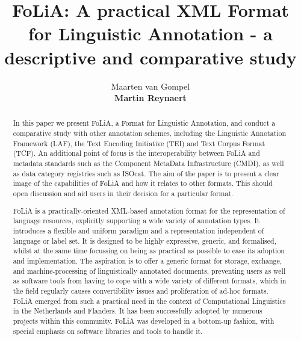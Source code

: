 \documentclass[a4paper,10pt,twoside]{article}
\begin{document}
\title{FoLiA: A practical XML Format for Linguistic Annotation - a descriptive and comparative study}

\author{Maarten van Gompel \\
{\normalsize \bf Martin Reynaert} 
\AND {} \AND {} }



\maketitle

\begin{abstract}

In this paper we present FoLiA, a Format for Linguistic Annotation, and conduct
a comparative study with other annotation schemes, including the Linguistic
Annotation Framework (LAF), the Text Encoding Initiative (TEI) and Text Corpus
Format (TCF). An additional point of focus is the interoperability between
FoLiA and metadata standards such as the Component MetaData Infrastructure
(CMDI), as well as data category registries such as ISOcat. The aim of the
paper is to present a clear image of the capabilities of FoLiA and how it
relates to other formats. This should open discussion and aid users in their
decision for a particular format.

FoLiA is a practically-oriented XML-based annotation format for the
representation of language resources, explicitly supporting a wide variety of annotation
types. It introduces a flexible and uniform paradigm and a representation
independent of language or label set. It is designed to be highly expressive,
generic, and formalised, whilst at the same time focussing on being as
practical as possible to ease its adoption and implementation. The aspiration
is to offer a generic format for storage, exchange, and machine-processing of
linguistically annotated documents, preventing users as well as software tools
from having to cope with a wide variety of different formats, which in the
field regularly causes convertibility issues and proliferation of ad-hoc
formats. FoLiA emerged from such a practical need in the context of
Computational Linguistics in the Netherlands and Flanders. It has been
successfully adopted by numerous projects within this community. FoLiA was
developed in a bottom-up fashion, with special emphasis on software libraries
and tools to handle it.

\end{abstract}
\end{document}
